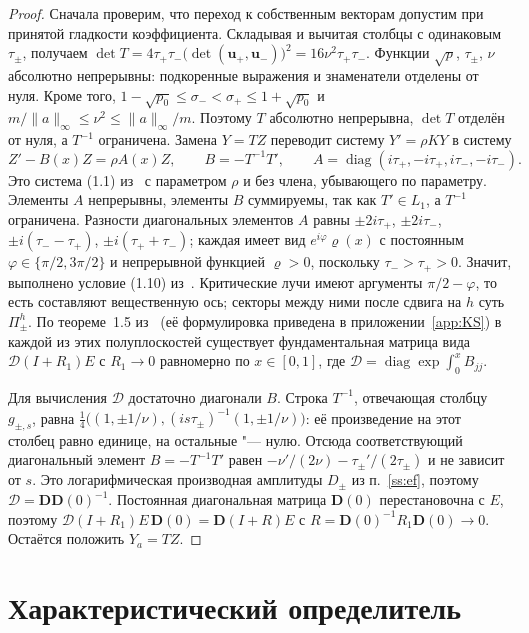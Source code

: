 \documentclass[12pt,a4paper]{article}
\numberwithin{equation}{section}
\theoremstyle{definition}
\newcommand{\norm}[1]{\lVert#1\rVert}
\newcommand{\Dd}{\mathbf D}
\begin{document}
\begin{proof}
Сначала проверим, что переход к собственным векторам допустим при принятой
гладкости коэффициента. Складывая и вычитая столбцы с одинаковым $\tau_\pm$,
получаем
$\det T=4\tau_+\tau_-\bigl(\det(\mathbf u_+,\mathbf u_-)\bigr)^2=16\nu^2\tau_+\tau_-$.
Функции $\sqrt p$, $\tau_\pm$, $\nu$ абсолютно непрерывны: подкоренные выражения
и знаменатели отделены от нуля. Кроме того,
$1-\sqrt{p_0}\le\sigma_-<\sigma_+\le1+\sqrt{p_0}$ и
$m/\norm a_\infty\le\nu^2\le\norm a_\infty/m$.
Поэтому $T$ абсолютно непрерывна, $\det T$ отделён от нуля, а $T^{-1}$ ограничена.
Замена $Y=TZ$ переводит систему $Y'=\rho KY$ в систему
\[
 Z'-B(x)Z=\rho A(x)Z,\qquad B=-T^{-1}T',\qquad
 A=\operatorname{diag}(i\tau_+,-i\tau_+,i\tau_-,-i\tau_-).
\]
Это система (1.1) из~\cite{KS1} с параметром $\rho$ и без члена, убывающего по параметру.
Элементы $A$ непрерывны, элементы $B$ суммируемы, так как $T'\in L_1$, а $T^{-1}$ ограничена.
Разности диагональных элементов $A$ равны $\pm2i\tau_+$, $\pm2i\tau_-$, $\pm i(\tau_--\tau_+)$,
$\pm i(\tau_++\tau_-)$; каждая имеет вид $e^{i\varphi}\varrho(x)$ с постоянным
$\varphi\in\{\pi/2,3\pi/2\}$ и непрерывной функцией $\varrho>0$, поскольку $\tau_->\tau_+>0$.
Значит, выполнено условие (1.10) из~\cite{KS1}. Критические лучи имеют аргументы
$\pi/2-\varphi$, то есть составляют вещественную ось; секторы между ними после
сдвига на $h$ суть $\Pi_\pm^h$. По теореме~1.5 из~\cite{KS1}
(её формулировка приведена в приложении~\ref{app:KS}) в каждой из этих
полуплоскостей существует фундаментальная матрица вида
$\mathcal D(I+R_1)E$ с $R_1\to0$ равномерно по $x\in[0,1]$, где
$\mathcal D=\operatorname{diag}\exp\int_0^xB_{jj}$.

Для вычисления $\mathcal D$ достаточно диагонали $B$. Строка $T^{-1}$,
отвечающая столбцу $g_{\pm,s}$, равна
$\frac14\bigl((1,\pm1/\nu),(is\tau_\pm)^{-1}(1,\pm1/\nu)\bigr)$:
её произведение на этот столбец равно единице, на остальные "--- нулю.
Отсюда соответствующий диагональный элемент $B=-T^{-1}T'$ равен
$-\nu'/(2\nu)-\tau_\pm'/(2\tau_\pm)$ и не зависит от $s$.
Это логарифмическая производная амплитуды $D_\pm$ из п.~\ref{ss:ef},
поэтому $\mathcal D=\Dd\Dd(0)^{-1}$. Постоянная
диагональная матрица $\Dd(0)$ перестановочна с $E$,
поэтому $\mathcal D(I+R_1)E\,\Dd(0)=\Dd(I+R)E$ с $R=\Dd(0)^{-1}R_1\Dd(0)\to0$. Остаётся
положить $Y_a=TZ$.
\end{proof}

\section{Характеристический определитель}
\end{document}
